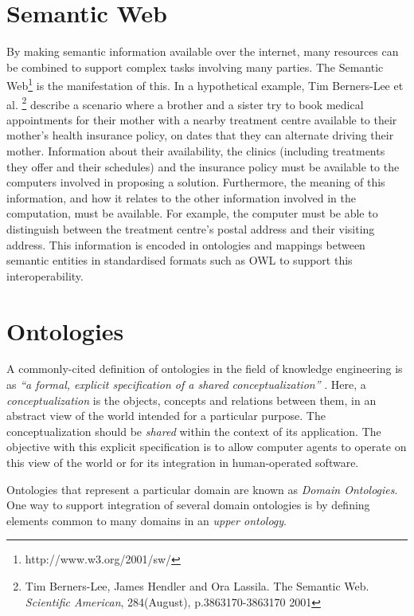 \documentclass[a4paper]{report}
\begin{document}
\section{Semantic Web}

By making semantic information available over the internet, many resources can be combined to support complex tasks involving many parties.
The Semantic Web\footnote{http://www.w3.org/2001/sw/} is the manifestation of this.
In a hypothetical example, Tim Berners-Lee et al. \footnote{Tim Berners-Lee, James Hendler and Ora Lassila. The Semantic Web. \emph{Scientific American}, 284(August), p.3863170-3863170 2001} describe a scenario where a brother and a sister try to book medical appointments for their mother with a nearby treatment centre available to their mother's health insurance policy, on dates that they can alternate driving their mother.
Information about their availability, the clinics (including treatments they offer and their schedules) and the insurance policy must be available to the computers involved in proposing a solution.
Furthermore, the meaning of this information, and how it relates to the other information involved in the computation, must be available.
For example, the computer must be able to distinguish between the treatment centre's postal address and their visiting address.
This information is encoded in ontologies and mappings between semantic entities in standardised formats such as OWL\cite{OWLOverview2004} to support this interoperability.

\section{Ontologies}

A commonly-cited definition of ontologies in the field of knowledge engineering is as \emph{``a formal, explicit specification of a shared conceptualization''} \cite{StuderEtAl1998KEPM}.
Here, a \emph{conceptualization} is the objects, concepts and relations between them, in an abstract view of the world intended for a particular purpose.
The conceptualization should be \emph{shared} within the context of its application.
The objective with this explicit specification is to allow computer agents to operate on this view of the world or for its integration in human-operated software.

Ontologies that represent a particular domain are known as \emph{Domain Ontologies}.
One way to support integration of several domain ontologies is by defining elements common to many domains in an \emph{upper ontology}\cite{SemanticIntegration2004Noy}.
\end{document}

